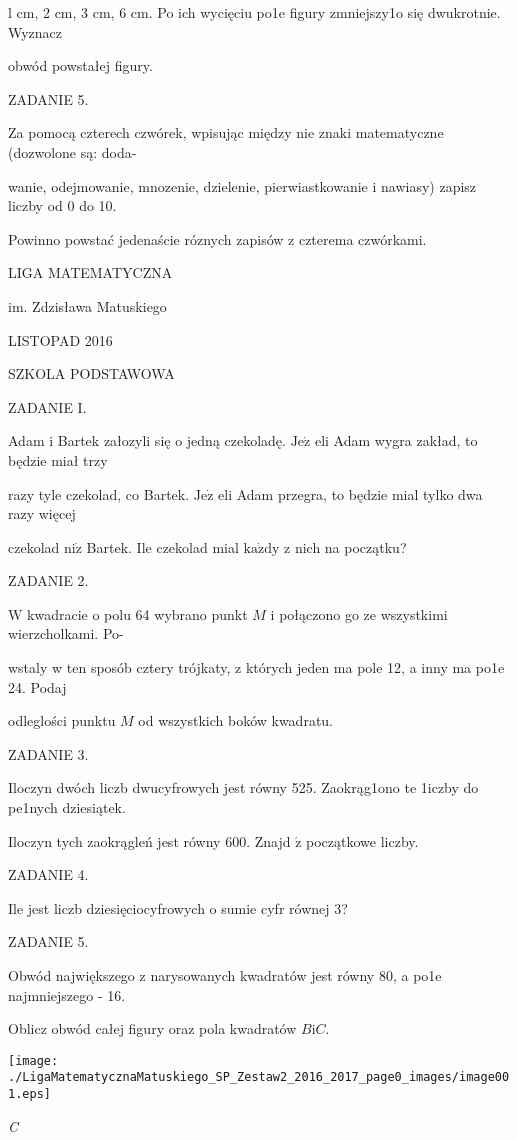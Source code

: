 \documentclass[a4paper,12pt]{article}
\begin{document}
l cm, 2 cm, 3 cm, 6 cm. Po ich wycięciu po1e figury zmniejszy1o się dwukrotnie. Wyznacz

obwód powstałej figury.

ZADANIE 5.

Za pomocą czterech czwórek, wpisując między nie znaki matematyczne (dozwolone są: doda-

wanie, odejmowanie, mnozenie, dzielenie, pierwiastkowanie i nawiasy) zapisz liczby od 0 do 10.

Powinno powstać jedenaście róznych zapisów z czterema czwórkami.






LIGA MATEMATYCZNA

im. Zdzisława Matuskiego

LISTOPAD 2016

SZKOLA PODSTAWOWA

ZADANIE I.

Adam i Bartek załozyli się o jedną czekoladę. $\mathrm{J}\mathrm{e}\dot{\mathrm{z}}$ eli Adam wygra zakład, to będzie miał trzy

razy tyle czekolad, co Bartek. $\mathrm{J}\mathrm{e}\dot{\mathrm{z}}$ eli Adam przegra, to będzie mial tylko dwa razy więcej

czekolad $\mathrm{n}\mathrm{i}\dot{\mathrm{z}}$ Bartek. Ile czekolad mial $\mathrm{k}\mathrm{a}\dot{\mathrm{z}}\mathrm{d}\mathrm{y}$ z nich na początku?

ZADANIE 2.

$\mathrm{W}$ kwadracie o polu 64 wybrano punkt $M$ i połączono go ze wszystkimi wierzcholkami. Po-

wstaly w ten sposób cztery trójkaty, z których jeden ma pole 12, a inny ma po1e 24. Podaj

odleglości punktu $M$ od wszystkich boków kwadratu.

ZADANIE 3.

Iloczyn dwóch liczb dwucyfrowych jest równy 525. Zaokrąg1ono te 1iczby do pe1nych dziesiątek.

Iloczyn tych zaokrągleń jest równy 600. Znajd $\acute{\mathrm{z}}$ początkowe liczby.

ZADANIE 4.

Ile jest liczb dziesięciocyfrowych o sumie cyfr równej 3?

ZADANIE 5.

Obwód największego z narysowanych kwadratów jest równy 80, a po1e najmniejszego - 16.

Oblicz obwód całej figury oraz pola kwadratów $B\mathrm{i}C.$
\begin{center}
\texttt{[image: ./LigaMatematycznaMatuskiego\_SP\_Zestaw2\_2016\_2017\_page0\_images/image001.eps]}
\end{center}
{\it C}
\end{document}
